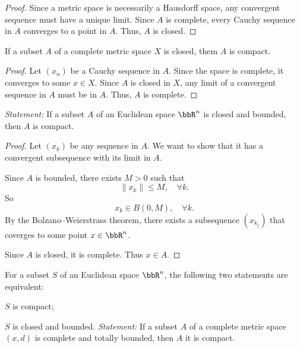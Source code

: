 \documentclass[a4paper,12pt]{article}
\begin{document}
\begin{proof}
Since a metric space is necessarily a Hausdorff space, any convergent sequence must have a unique limit. Since $A$ is complete, every Cauchy sequence in $A$ converges to a point in $A$. Thus, $A$ is closed.
\end{proof}
 If a subset $A$ of a complete metric space $X$ is closed, them $A$ is compact.

\begin{proof}
Let $(x_n)$ be a Cauchy sequence in $A$. Since the space is complete, it converges to some $x\in X$. Since $A$ is closed in $X$, any limit of a convergent sequence in $A$ must be in $A$. Thus, $A$ is complete.
\end{proof}
\textit{Statement: }If a subset $A$ of an Euclidean space $\bbR^n$ is closed and bounded, then $A$ is compact.

\begin{proof}
Let $(x_k)$ be any sequence in $A$. We want to show that it has a convergent subsequence with its limit in $A$.

Since $A$ is bounded, there exists $M>0$ such that
    \[\|x_k\|\leq M,\quad\forall k.\]
    So
    \[x_k\in B(0,M),\quad\forall k.\]
    By the Bolzano–Weierstrass theorem, there exists a subsequence $(x_{k_j})$ that coverges to some point $x\in\bbR^n$.
    
    Since $A$ is closed, it is complete. Thus $x\in A$.
\end{proof}
For a subset $S$ of an Euclidean space $\bbR^n$, the following two statements are equivalent:
\bit
\item $S$ is compact;
\item $S$ is closed and bounded.
\eit
{}
\textit{Statement: }If a subset $A$ of a complete metric space $(x,d)$ is complete and totally bounded, then $A$ it is compact.
\end{document}
